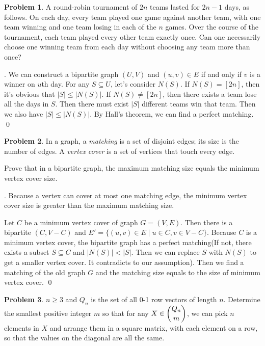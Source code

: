 \documentclass[12pt]{article}
\providecommand{\abs}[1]{\lvert#1\rvert}
\theoremstyle{definition}
\newtheorem{hw}{Problem}
\newenvironment{sol}
  {\par\vspace{3mm}\noindent{\it Solution}.}
  {\qed}
\begin{document}
\begin{hw}
A round-robin tournament of $2n$ teams lasted for $2n-1$ days, as follows.
On each day, every team played one game against another team, with one team winning
and one team losing in each of the $n$ games. Over the course of the tournament,
each team played every other team exactly once. Can one necessarily choose
one winning team from each day without choosing any team more than once?
\end{hw}

\begin{sol}
	We can construct a bipartite graph $(U,V)$ and $(u,v) \in E$ if and only if $v$ is a winner on $u$th day. For any $S \subseteq U$, let's consider $N(S)$. If $N(S) = [2n]$, then it's obvious that $\abs{S} \leq \abs{N(S)}$. If $N(S) \neq [2n]$, then there exists a team lose all the days in $S$. Then there must exist $\abs{S}$ different teams win that team. Then we also have $\abs{S} \leq \abs{N(S)}$. By Hall's theorem, we can find a perfect matching. 
\end{sol}

\begin{hw}
In a graph, a {\em matching} is a set of disjoint edges; its size is the number of edges. A {\em vertex cover}
is a set of vertices that touch every edge.

Prove that in a bipartite graph, the maximum matching size equals the minimum vertex cover size.
\end{hw}

\begin{sol}
	Because a vertex can cover at most one matching edge, the minimum vertex cover size is greater than the maximum matching size.
	
	Let $C$ be a minimum vertex cover of graph $G = (V,E)$. Then there is a bipartite $(C,V-C)$ and $E' = \{(u,v) \in E \mid u \in C, v \in V-C\}$. Because $C$ is a minimum vertex cover, the bipartite graph has a perfect matching(If not, there exists a subset $S \subseteq C$ and $\abs{N(S)}<\abs{S}$. Then we can replace $S$ with $N(S)$ to get a smaller vertex cover. It contradicts to our assumption). Then we find a matching of the old graph $G$ and the matching size equals to the size of minimum vertex cover.
\end{sol}

\begin{hw}
$n \geq 3$ and $Q_n$ is the set of all 0-1 row vectors of length $n$. Determine the smallest
positive integer $m$ so that for any $X \in \dbinom{Q_n}{m}$, we can pick $n$ elements in $X$
and arrange them in a square matrix, with each element on a row, so that the values on the diagonal
are all the same.
\end{hw}
\end{document}
